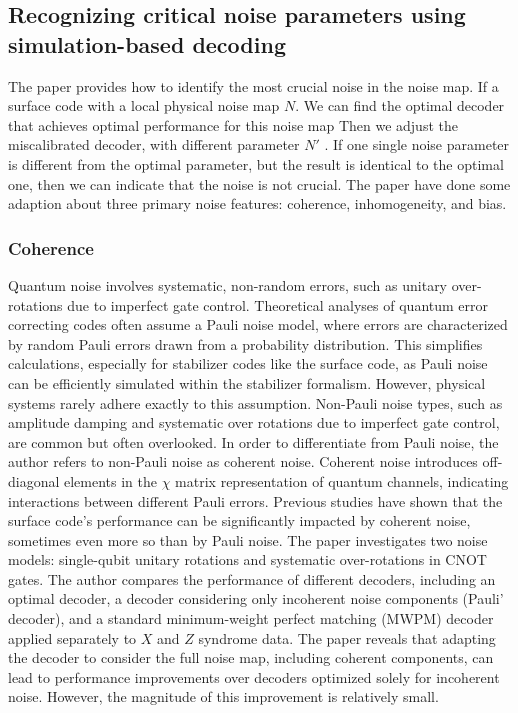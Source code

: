 \subsection{Recognizing critical noise parameters using simulation-based decoding}

The paper provides how to identify the most crucial noise in the noise map. If a surface code with a local physical noise map $N$. We can find the optimal decoder that achieves optimal performance for this noise map Then we adjust the miscalibrated decoder, with different parameter $N'$ . If one single noise parameter is different from the optimal parameter, but the result is identical to the optimal one, then we can indicate that the noise is not crucial. The paper have done some adaption about three primary noise features: coherence, inhomogeneity, and bias.
\subsubsection{Coherence}

Quantum noise involves systematic, non-random errors, such as unitary over-rotations due to imperfect gate control. Theoretical analyses of quantum error correcting codes often assume a Pauli noise model, where errors are characterized by random Pauli errors drawn from a probability distribution. This simplifies calculations, especially for stabilizer codes like the surface code, as Pauli noise can be efficiently simulated within the stabilizer formalism. However, physical systems rarely adhere exactly to this assumption. Non-Pauli noise types, such as amplitude damping and systematic over rotations due to imperfect gate control, are common but often overlooked. In order to differentiate from Pauli noise, the author refers to non-Pauli noise as coherent noise. Coherent noise introduces off-diagonal elements in the $\chi$ matrix representation of quantum channels, indicating interactions between different Pauli errors. Previous studies have shown that the surface code's performance can be significantly impacted by coherent noise, sometimes even more so than by Pauli noise. The paper investigates two noise models: single-qubit unitary rotations and systematic over-rotations in CNOT gates. The author compares the performance of different decoders, including an optimal decoder, a decoder considering only incoherent noise components (Pauli' decoder), and a standard minimum-weight perfect matching (MWPM) decoder applied separately to $X$ and $Z$ syndrome data. The paper reveals that adapting the decoder to consider the full noise map, including coherent components, can lead to performance improvements over decoders optimized solely for incoherent noise. However, the magnitude of this improvement is relatively small.

